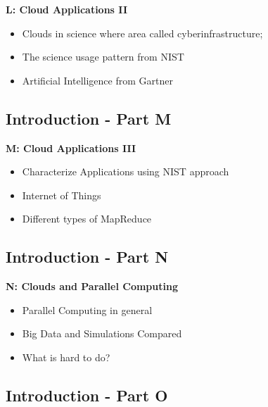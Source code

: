 \textbf{L: Cloud Applications II}
\begin{itemize}
\item Clouds in science where area called cyberinfrastructure; 
\item The science usage pattern from NIST
\item Artificial Intelligence from Gartner
\end{itemize}

\subsection{Introduction - Part M}\label{s:cloud-fundamentals-m}

\textbf{M: Cloud Applications III}
\begin{itemize}
\item Characterize Applications using NIST approach
\item Internet of Things
\item Different types of MapReduce
\end{itemize}

\subsection{Introduction - Part N}\label{s:cloud-fundamentals-n}

\textbf{N: Clouds and Parallel Computing}
\begin{itemize}
\item Parallel Computing in general
\item Big Data and Simulations Compared
\item What is hard to do?

\end{itemize} 

\subsection{Introduction - Part O}\label{s:cloud-fundamentals-o}

